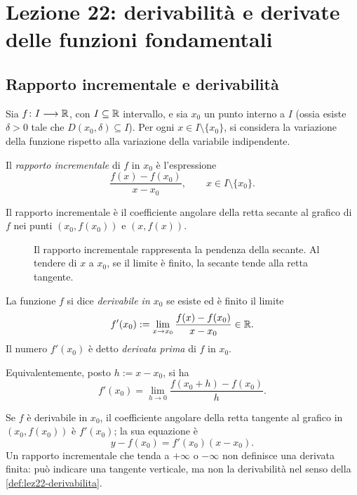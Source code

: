 \chapter[Lezione 22 --- 20 novembre 2026]{Lezione 22: derivabilità e derivate delle funzioni fondamentali}
\label{chap:lezione-22}

\section{Rapporto incrementale e derivabilità}
\label{sec:lez22-derivabilita}

Sia \(f\colon I\longrightarrow\mathbb{R}\), con \(I\subseteq\mathbb{R}\)
intervallo, e sia \(x_0\) un punto interno a \(I\)
(ossia esiste \(\delta>0\) tale che
\(D(x_0,\delta)\subseteq I\)).
Per ogni \(x\in I\setminus\{x_0\}\), si considera
la variazione della funzione rispetto alla variazione
della variabile indipendente.

\begin{definition}
\label{def:lez22-rapporto-incrementale}
Il \emph{rapporto incrementale} di \(f\) in \(x_0\)
è l'espressione
\[
  \frac{f(x)-f(x_0)}{x-x_0},
  \qquad x\in I\setminus\{x_0\}.
\]
\end{definition}

Il rapporto incrementale è il coefficiente angolare della
retta secante al grafico di \(f\) nei punti
\((x_0,f(x_0))\) e \((x,f(x))\).

\begin{figure}[htbp]
  \centering
  
  \caption{Il rapporto incrementale rappresenta la pendenza
  della secante. Al tendere di \(x\) a \(x_0\), se il limite
  è finito, la secante tende alla retta tangente.}
  \label{fig:lez22-rapporto-incrementale}
\end{figure}

\begin{definition}
\label{def:lez22-derivabilita}
La funzione \(f\) si dice \emph{derivabile in \(x_0\)}
se esiste ed è finito il limite
\[
  f'(x_0):=\lim_{x\to x_0}
    \frac{f(x)-f(x_0)}{x-x_0}\in\mathbb{R}.
\]
Il numero \(f'(x_0)\) è detto \emph{derivata prima}
di \(f\) in \(x_0\).
\end{definition}

Equivalentemente, posto \(h:=x-x_0\), si ha
\[
  f'(x_0)=\lim_{h\to0}\frac{f(x_0+h)-f(x_0)}h.
\]

Se \(f\) è derivabile in \(x_0\), il coefficiente
angolare della retta tangente al grafico in
\((x_0,f(x_0))\) è \(f'(x_0)\); la sua equazione è
\[
  y-f(x_0)=f'(x_0)(x-x_0).
\]
Un rapporto incrementale che tenda a \(+\infty\)
o \(-\infty\) non definisce una derivata finita:
può indicare una tangente verticale, ma non la
derivabilità nel senso della \cref{def:lez22-derivabilita}.

